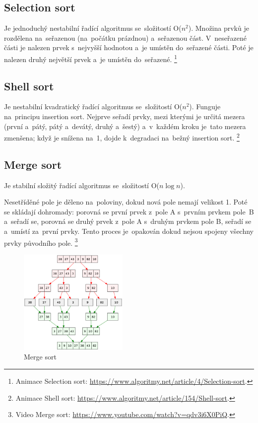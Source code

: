 \subsection{Selection sort}

Je jednoduchý nestabilní řadící algoritmus se~složitostí O(\( n^2 \)). Množina prvků je rozdělena na~seřazenou (na~počátku prázdnou) a~seřazenou část. V~neseřazené části je nalezen prvek s~nejvyšší hodnotou a~je umístěn do~seřazené části. Poté je nalezen druhý největší prvek a~je umístěn do~seřazené.%
\footnote{Animace Selection sort: \url{https://www.algoritmy.net/article/4/Selection-sort}.}

\subsection{Shell sort}

Je nestabilní kvadratický řadící algoritmus se~složitostí O(\( n^2 \)). Funguje na~principu insertion sort. Nejprve seřadí prvky, mezi kterými je určitá mezera (první a~pátý, pátý a~devátý, druhý a~šestý) a~v~každém kroku je~tato mezera zmenšena; když je snížena na~1, dojde k~degradaci na~bežný insertion sort.%
\footnote{Animace Shell sort: \url{https://www.algoritmy.net/article/154/Shell-sort}.}

\subsection{Merge sort}

Je stabilní složitý řadící algoritmus se~složitostí O(\( n\log{n} \)).

Nesetříděné pole je děleno na~poloviny, dokud nová pole nemají velikost 1. Poté se skládají dohromady: porovná se první prvek z~pole A s~prvním prvkem pole~B a~seřadí se, porovná se druhý prvek z~pole A s~druhým prvkem pole B, seřadí se a~umístí za~první prvky. Tento proces je~opakován dokud nejsou spojeny všechny prvky původního pole.%
\footnote{Video Merge sort: \url{https://www.youtube.com/watch?v=qdv3i6X0PiQ}.}

\begin{figure}[ht]
	\centering
	\includegraphics[width=0.47\textwidth]{images/merge-sort}
	\caption{Merge sort}
\end{figure}


